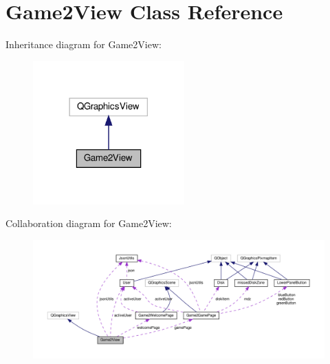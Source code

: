 \hypertarget{classGame2View}{}\section{Game2\+View Class Reference}
\label{classGame2View}


Inheritance diagram for Game2\+View\+:
\nopagebreak
\begin{figure}[H]
\begin{center}
\leavevmode
\includegraphics[width=165pt]{classGame2View__inherit__graph}
\end{center}
\end{figure}


Collaboration diagram for Game2\+View\+:
\nopagebreak
\begin{figure}[H]
\begin{center}
\leavevmode
\includegraphics[width=350pt]{classGame2View__coll__graph}
\end{center}
\end{figure}
